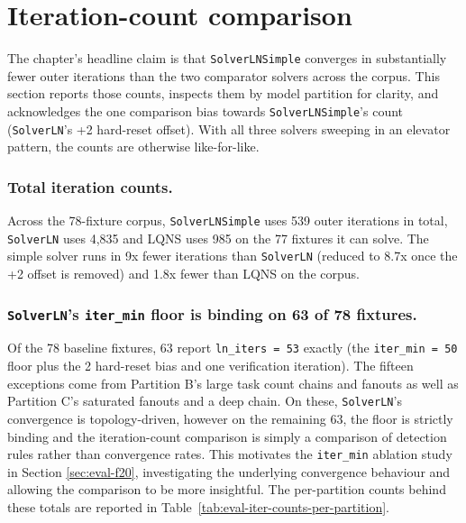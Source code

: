 

\section{Iteration-count comparison}
\label{sec:eval-iteration-comparison}

The chapter's headline claim is that \texttt{SolverLNSimple} converges in substantially fewer outer iterations than the two comparator solvers across the corpus. This section reports those counts, inspects them by model partition for clarity, and acknowledges the one comparison bias towards \texttt{SolverLNSimple}'s count (\texttt{SolverLN}'s +2 hard-reset offset). With all three solvers sweeping in an elevator pattern, the counts are otherwise like-for-like.

\subsubsection*{Total iteration counts.} 
Across the 78-fixture corpus, \texttt{SolverLNSimple} uses 539 outer iterations in total, \texttt{SolverLN} uses 4,835 and LQNS uses 985 on the 77 fixtures it can solve. The simple solver runs in 9x fewer iterations than \texttt{SolverLN} (reduced to 8.7x once the +2 offset is removed) and 1.8x fewer than LQNS on the corpus.

\subsubsection*{\texttt{SolverLN}'s \texttt{iter\_min} floor is binding on 63 of 78 fixtures.} 
Of the 78 baseline fixtures, 63 report \texttt{ln\_iters = 53} exactly (the \texttt{iter\_min = 50} floor plus the 2 hard-reset bias and one verification iteration). The fifteen exceptions come from Partition B's large task count chains and fanouts as well as Partition C's saturated fanouts and a deep chain. On these, \texttt{SolverLN}'s convergence is topology-driven, however on the remaining 63, the floor is strictly binding and the iteration-count comparison is simply a comparison of detection rules rather than convergence rates. This motivates the \texttt{iter\_min} ablation study in Section \ref{sec:eval-f20}, investigating the underlying convergence behaviour and allowing the comparison to be more insightful. The per-partition counts behind these totals are reported in Table~\ref{tab:eval-iter-counts-per-partition}.

